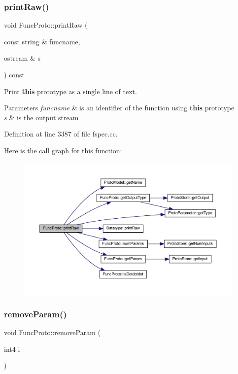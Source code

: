 \subsubsection{\texorpdfstring{printRaw()}{printRaw()}}
{\footnotesize\ttfamily void Func\+Proto\+::print\+Raw (\begin{DoxyParamCaption}\item[{const string \&}]{funcname,  }\item[{ostream \&}]{s }\end{DoxyParamCaption}) const}



Print {\bfseries{this}} prototype as a single line of text. 


\begin{DoxyParams}{Parameters}
{\em funcname} & is an identifier of the function using {\bfseries{this}} prototype \\
\hline
{\em s} & is the output stream \\
\hline
\end{DoxyParams}


Definition at line 3387 of file fspec.\+cc.

Here is the call graph for this function\+:
\nopagebreak
\begin{figure}[H]
\begin{center}
\leavevmode
\includegraphics[width=350pt]{class_func_proto_acf8d609764a4fd6c38cb0c284f225180_cgraph}
\end{center}
\end{figure}
\mbox{\label{class_func_proto_abc9a8f192846b36ba99ed0464bb10862}} 
\subsubsection{\texorpdfstring{removeParam()}{removeParam()}}
{\footnotesize\ttfamily void Func\+Proto\+::remove\+Param (\begin{DoxyParamCaption}\item[{int4}]{i }\end{DoxyParamCaption})\hspace{0.3cm}{\ttfamily [inline]}}



